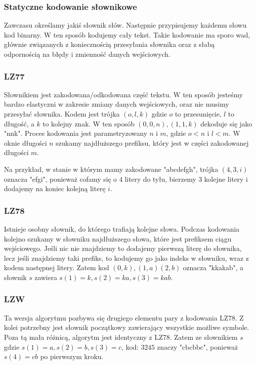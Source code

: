 \documentclass{../notatki}
\begin{document}
\subsubsection{Statyczne kodowanie słownikowe}

Zawczasu określamy jakiś słownik słów. Następnie przypisujemy każdemu słowu
kod binarny. W ten sposób kodujemy cały tekst. Takie kodowanie ma sporo wad,
głównie związanych z koniecznością przesyłania słownika oraz z słabą
odpornością na błędy i zmienność danych wejściowych.

\subsubsection{LZ77}

Słownikiem jest zakodowana/odkodowana część tekstu. W ten sposób jesteśmy bardzo
elastyczni w zakresie zmiany danych wejściowych, oraz nie musimy przesyłać
słownika. Kodem jest trójka $(o, l, k)$ gdzie $o$ to przesunięcie, $l$ to
długość, a $k$ to kolejny znak. W ten sposób $(0, 0, n),(1, 1, k)$ dekoduje się
jako "nnk". Proces kodowania jest parametryzowany $n$ i $m$, gdzie $o < n$ i
$l < m$. W oknie długości $n$ szukamy najdłuższego prefiksu, który jest
w części zakodowanej długości $m$.

Na przykład, w stanie w którym mamy zakodowane "abcdefgh", trójka $(4, 3, i)$
oznacza "efgi", ponieważ cofamy się o $4$ litery do tyłu, bierzemy $3$ kolejne
litery i dodajemy na koniec kolejną literę $i$.

\subsubsection{LZ78}

Istnieje osobny słownik, do którego trafiają kolejne słowa. Podczas kodowania
kolejno szukamy w słowniku najdłuższego słowa, które jest prefiksem ciągu
wejściowego. Jeśli nic nie znajdziemy to dodajemy pierwszą literę do słownika,
lecz jeśli znajdziemy taki prefiks, to kodujemy go jako indeks w słowniku,
wraz z kodem następnej litery. Zatem kod $(0,k),(1,a)(2,b)$ oznacza "kkakab",
a słownik $s$ zawiera $s(1)=k,s(2)=ka,s(3)=kab$.

\subsubsection{LZW}

Ta wersja algorytmu pozbywa się drugiego elementu pary z kodowania LZ78.
Z kolei potrzebny jest słownik początkowy zawierający wszystkie możliwe
symbole. Poza tą mała różnicą, algorytm jest identyczny z LZ78.
Zatem ze słownikiem $s$ gdzie $s(1)=a,s(2)=b,s(3)=c$, kod:
$3245$ znaczy "cbcbbc", ponieważ $s(4)=cb$ po pierwszym kroku.
\end{document}
